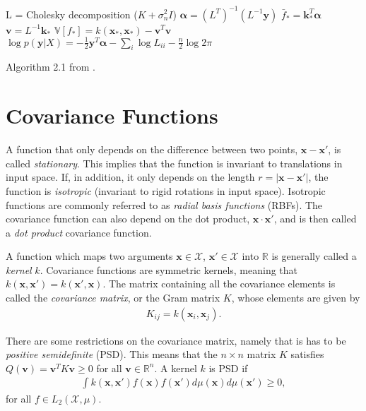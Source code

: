 \documentclass[twoside,english]{uiofysmaster}
\begin{document}
\begin{algorithm}
L = Cholesky decomposition ($K + \sigma_n^2 I$) \;
$\boldsymbol{\alpha} = (L^T)^{-1}(L^{-1} \textbf{y})$ \;
$\bar{f}_* = \textbf{k}_*^T \boldsymbol{\alpha}$ \;
$\textbf{v} = L^{-1} \textbf{k}_*$ \;
$\mathbb{V}[f_*] = k(\textbf{x}_*, \textbf{x}_*) - \textbf{v}^T \textbf{v}$ \;
$\log p(\textbf{y}|X) = - \frac{1}{2} \textbf{y}^T \boldsymbol{\alpha} - \sum_i \log L_{ii} - \frac{n}{2} \log 2 \pi$ \;
\caption{Algorithm 2.1 from \cite{rasmussen2006gaussian}.}
\label{Alg:: GP}
\end{algorithm}

\section{Covariance Functions}
A function that only depends on the difference between two points, $\textbf{x} - \textbf{x}'$, is called \textit{stationary}. This implies that the function is invariant to translations in input space. If, in addition, it only depends on the length $r=|\textbf{x}-\textbf{x}'|$, the function is \textit{isotropic} (invariant to rigid rotations in input space).  Isotropic functions are commonly referred to as \textit{radial basis functions} (RBFs). The covariance function can also depend on the dot product, $\textbf{x} \cdot \textbf{x}'$, and is then called a \textit{dot product} covariance function.

A function which maps two arguments $\textbf{x} \in \mathcal{X}$, $\textbf{x}' \in \mathcal{X}$ into $\mathbb{R}$ is generally called a \textit{kernel} $k$. Covariance functions are symmetric kernels, meaning that $k(\textbf{x}, \textbf{x}') = k(\textbf{x}', \textbf{x})$. The matrix containing all the covariance elements is called the \textit{covariance matrix}, or the Gram matrix $K$, whose elements are given by
\begin{align}\label{Eq:: covariance matrix}
K_{ij} = k(\textbf{x}_i, \textbf{x}_j).
\end{align}

There are some restrictions on the covariance matrix, namely that is has to be \textit{positive semidefinite} (PSD). This means that the $n \times n $ matrix $K$ satisfies $Q(\textbf{v}) = \textbf{v}^T K \textbf{v} \geq 0 $ for all $\textbf{v} \in \mathbb{R}^n$. A kernel $k$ is PSD if
\begin{align}\label{Eq:: PSD kernel}
\int k(\textbf{x}, \textbf{x}') f(\textbf{x}) f(\textbf{x}') d \mu (\textbf{x}) d \mu (\textbf{x}') \geq 0,
\end{align}
for all $f \in L_2(\mathcal{X}, \mu)$.
\end{document}
